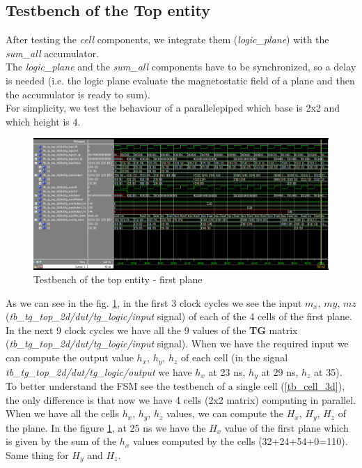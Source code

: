 \subsection{Testbench of the Top entity}
After testing the \textit{cell} components, we integrate them (\textit{logic\_plane}) with the \textit{sum\_all} accumulator.\\
The \textit{logic\_plane} and the \textit{sum\_all} components have to be synchronized, so a delay is needed (i.e. the logic plane evaluate the magnetostatic field of a plane and then the accumulator is ready to sum).\\
For simplicity, we test the behaviour of a parallelepiped which base is 2x2 and which height is 4.

\begin{figure}[h]
	\centering
	\includegraphics[width=\textwidth]{imm/3d/tb_3d_top.png}  
	\caption{Testbench of the top entity - first plane}
	\label{tb_3d_top}
\end{figure}
As we can see in the fig. \ref{tb_3d_top}, in the first 3 clock cycles we see the input   $m_x$, $ my$, $mz $ (\textit{tb\_tg\_top\_2d/dut/tg\_logic/input} signal) of each of the 4 cells of the first plane.\\
In the next 9 clock cycles we have all the 9 values of the  \textbf{TG}  matrix (\textit{tb\_tg\_top\_2d/dut/tg\_logic/input} signal). When we have the required input we can compute the output value $ h_x $, $ h_y $, $ h_z $ of each cell (in the signal \textit{tb\_tg\_top\_2d/dut/tg\_logic/output} we have  $ h_x $ at 23 ns, $ h_y $ at 29 ns, $ h_z $ at 35). To better understand the FSM see the testbench of a single cell (\ref{tb_cell_3d}), the only difference is that now we have 4 cells (2x2 matrix) computing in parallel.\\
When we have all the cells $ h_x $, $ h_y $, $ h_z $ values, we can compute the  $ H_x $, $ H_y $, $ H_z $ of the plane. In the figure \ref{tb_3d_top}, at 25 ns we have the $H_x$ value of the first plane which is given by the sum of the $h_x$ values computed by the cells (32+24+54+0=110). Same thing for $H_y$ and $H_z$.\\
